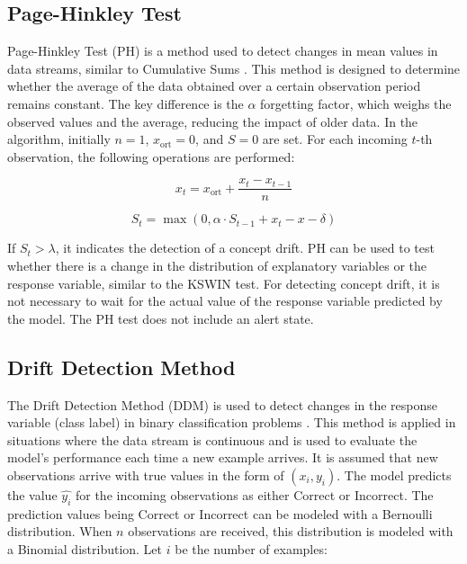 \documentclass[pdflatex,sn-mathphys-ay]{sn-jnl}%
\theoremstyle{thmstyleone}%
\theoremstyle{thmstyletwo}%
\theoremstyle{thmstylethree}%
\begin{document}
\subsection{Page-Hinkley Test}
Page-Hinkley Test (PH) is a method used to detect changes in mean values in data streams, similar to Cumulative Sums \citep{sebastiano_fernandes_2017}. This method is designed to determine whether the average of the data obtained over a certain observation period remains constant. The key difference is the \(\alpha\) forgetting factor, which weighs the observed values and the average, reducing the impact of older data. In the algorithm, initially \(n = 1\), \(x_{\text{ort}} = 0\), and \(S = 0\) are set. For each incoming \(t\)-th observation, the following operations are performed:

\begin{equation}
x_t = x_{\text{ort}} + \frac{x_t - x_{t-1}}{n}
\end{equation}

\begin{equation}
S_t = \max \left(0, \alpha \cdot S_{t-1} + x_t - x - \delta \right)
\end{equation}

\noindent If \(S_t > \lambda\), it indicates the detection of a concept drift. PH can be used to test whether there is a change in the distribution of explanatory variables or the response variable, similar to the KSWIN test. For detecting concept drift, it is not necessary to wait for the actual value of the response variable predicted by the model. The PH test does not include an alert state.


\subsection{Drift Detection Method}

The Drift Detection Method (DDM) is used to detect changes in the response variable (class label) in binary classification problems \citep{gama_2004}. This method is applied in situations where the data stream is continuous and is used to evaluate the model's performance each time a new example arrives. It is assumed that new observations arrive with true values in the form of \((x_i, y_i)\). The model predicts the value \(\hat{y_i}\) for the incoming observations as either Correct or Incorrect. The prediction values being Correct or Incorrect can be modeled with a Bernoulli distribution. When \(n\) observations are received, this distribution is modeled with a Binomial distribution. Let \(i\) be the number of examples:\\
\end{document}

